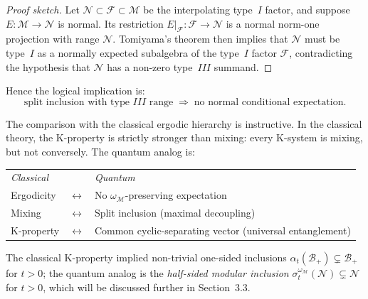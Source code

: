 \documentclass[a4paper,11pt]{article}
\theoremstyle{definition}
\begin{document}
\begin{proof}[Proof sketch]
Let $\mathcal{N}\subset\mathcal{F}\subset\mathcal{M}$ be the interpolating type~$I$
factor, and suppose $E:\mathcal{M}\to\mathcal{N}$ is normal.  Its restriction
$E|_\mathcal{F}:\mathcal{F}\to\mathcal{N}$ is a normal norm-one projection with range
$\mathcal{N}$.  Tomiyama's theorem then implies that $\mathcal{N}$ must be type~$I$ as a
normally expected subalgebra of the type~$I$ factor $\mathcal{F}$, contradicting the
hypothesis that $\mathcal{N}$ has a non-zero type~$III$ summand.
\end{proof}

\noindent Hence the logical implication is:
\begin{equation}
  \text{split inclusion with type~}III\text{ range}
  \;\Longrightarrow\;
  \text{no normal conditional expectation.}
  \label{eq:split-no-CE}
\end{equation}

The comparison with the classical ergodic hierarchy is instructive.  In the classical
theory, the K-property is strictly stronger than mixing: every K-system is mixing, but not
conversely.  The quantum analog is:

\begin{center}
\begin{tabular}{lll}
  \textit{Classical} & & \textit{Quantum} \\[4pt]
  Ergodicity & $\longleftrightarrow$ & No $\omega_\mathcal{M}$-preserving expectation \\
  Mixing & $\longleftrightarrow$ & Split inclusion (maximal decoupling) \\
  K-property & $\longleftrightarrow$ & Common cyclic-separating vector (universal entanglement)
\end{tabular}
\end{center}

\medskip
\noindent The classical K-property implied non-trivial one-sided inclusions
$\alpha_t(\mathcal{B}_+)\subsetneq\mathcal{B}_+$ for $t>0$; the quantum analog is the
\emph{half-sided modular inclusion} $\sigma_t^{\omega_\mathcal{M}}(\mathcal{N})\subsetneq\mathcal{N}$
for $t>0$, which will be discussed further in Section~3.3.





\end{document}
